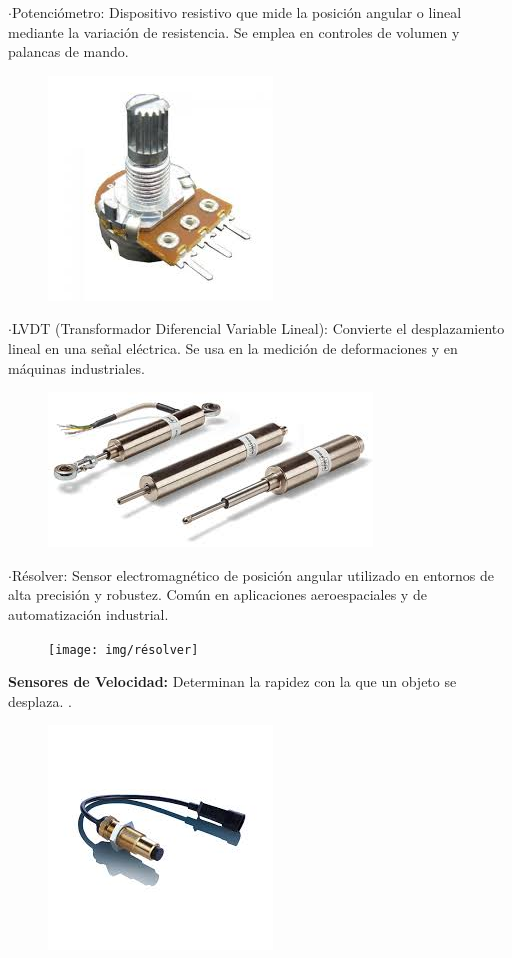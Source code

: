 	$\cdot$Potenciómetro: Dispositivo resistivo que mide la posición angular o lineal mediante la variación de resistencia. Se emplea en controles de volumen y palancas de mando.
	
	
\begin{figure} [h]
	\centering
	\includegraphics[width=0.3\linewidth]{img/potenciometro}
	\caption{}
	\label{fig:potenciometro}
\end{figure}


	$\cdot$LVDT (Transformador Diferencial Variable Lineal): Convierte el desplazamiento lineal en una señal eléctrica. Se usa en la medición de deformaciones y en máquinas industriales.


\begin{figure} [h]
	\centering
	\includegraphics[width=0.3\linewidth]{img/lvdt}
	\caption{}
	\label{fig:lvdt}
\end{figure}

\newpage
	$\cdot$Résolver: Sensor electromagnético de posición angular utilizado en entornos de alta precisión y robustez. Común en aplicaciones aeroespaciales y de automatización industrial.
	
	
\begin{figure} [h]
	\centering
	\texttt{[image: img/résolver]}
	\caption{}
	\label{fig:resolver}
\end{figure}
	

\textbf{Sensores de Velocidad:}
	Determinan la rapidez con la que un objeto se desplaza. \cite{johnson2018sensores}.
	
	
\begin{figure} [h]
	\centering
	\includegraphics[width=0.3\linewidth]{img/sensorvelocidad}
	\caption{}
	\label{fig:sensorvelocidad}
\end{figure}


